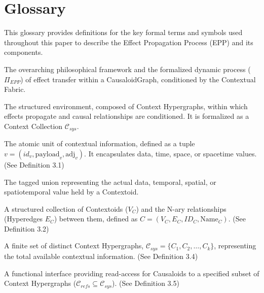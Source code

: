 \section*{Glossary}

This glossary provides definitions for the key formal terms and symbols used throughout this paper to describe the Effect Propagation Process (EPP) and its components.

\begin{description}[style=nextline] %

    \item[Effect Propagation Process (EPP)] 
    The overarching philosophical framework and the formalized dynamic process (\(\Pi_{EPP}\)) of effect transfer within a CausaloidGraph, conditioned by the Contextual Fabric.

    \item[Contextual Fabric (\(\mathcal{C}\))] 
    The structured environment, composed of Context Hypergraphs, within which effects propagate and causal relationships are conditioned. It is formalized as a Context Collection \(\mathcal{C}_{sys}\).

    \item[Contextoid (\(v\))] 
    The atomic unit of contextual information, defined as a tuple \(v = (id_v, \text{payload}_v, \text{adj}_v)\). It encapsulates data, time, space, or spacetime values. (See Definition 3.1)

    \item[Contextoid Payload (\(\text{payload}_v\))] 
    The tagged union representing the actual data, temporal, spatial, or spatiotemporal value held by a Contextoid.

    \item[Context Hypergraph (\(C\))] 
    A structured collection of Contextoids (\(V_C\)) and the N-ary relationships (Hyperedges \(E_C\)) between them, defined as \(C = (V_C, E_C, ID_C, \text{Name}_C)\). (See Definition 3.2)

    \item[Context Collection (\(\mathcal{C}_{sys}\))] 
    A finite set of distinct Context Hypergraphs, \(\mathcal{C}_{sys} = \{C_1, C_2, \dots, C_k\}\), representing the total available contextual information. (See Definition 3.4)

    \item[Context Accessor (\(\text{ContextAccessor}(\mathcal{C}_{refs})\))] 
    A functional interface providing read-access for Causaloids to a specified subset of Context Hypergraphs (\(\mathcal{C}_{refs} \subseteq \mathcal{C}_{sys}\)). (See Definition 3.5)


\end{description}
